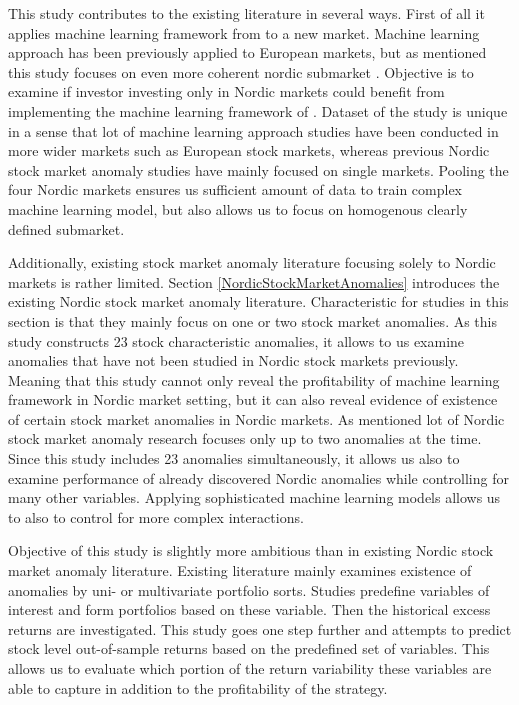 \documentclass[12pt]{article}
\begin{document}

This study contributes to the existing literature in several ways. First of all it applies machine learning framework from \citet{guetal} to a new market. Machine learning approach has been previously applied to European markets, but as mentioned this study focuses on even more coherent nordic submarket \citep{Drobetz, Fieberg}. Objective is to examine if investor investing only in Nordic markets could benefit from implementing the machine learning framework of \citet{guetal}. Dataset of the study is unique in a sense that lot of machine learning approach studies have been conducted in more wider markets such as European stock markets, whereas previous Nordic stock market anomaly studies have mainly focused on single markets. Pooling the four Nordic markets ensures us sufficient amount of data to train complex machine learning model, but also allows us to focus on homogenous clearly defined submarket. \par

Additionally, existing stock market anomaly literature focusing solely to Nordic markets is rather limited. Section \ref{NordicStockMarketAnomalies} introduces the existing Nordic stock market anomaly literature. Characteristic for studies in this section is that they mainly focus on one or two stock market anomalies. As this study constructs 23 stock characteristic anomalies, it allows to us examine anomalies that have not been studied in Nordic stock markets previously. Meaning that this study cannot only reveal the profitability of machine learning framework in Nordic market setting, but it can also reveal evidence of existence of certain stock market anomalies in Nordic markets. As mentioned lot of Nordic stock market anomaly research focuses only up to two anomalies at the time. Since this study includes 23 anomalies simultaneously, it allows us also to examine performance of already discovered Nordic anomalies while controlling for many other variables. Applying sophisticated machine learning models allows us to also to control for more complex interactions. \par

Objective of this study is slightly more ambitious than in existing Nordic stock market anomaly literature. Existing literature mainly examines existence of anomalies by uni- or multivariate portfolio sorts. Studies predefine variables of interest and form portfolios based on these variable. Then the historical excess returns are investigated. This study goes one step further and attempts to predict stock level out-of-sample returns based on the predefined set of variables. This allows us to evaluate which portion of the return variability these variables are able to capture in addition to the profitability of the strategy. \par
\end{document}
